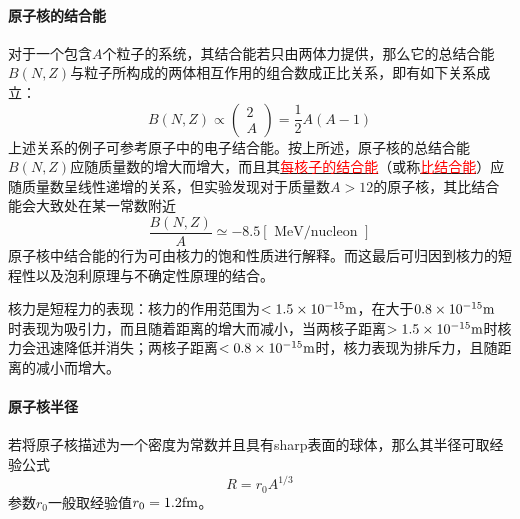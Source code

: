 \paragraph*{原子核的结合能}
对于一个包含$A$个粒子的系统，其结合能若只由两体力提供，那么它的总结合能$B(N,Z)$与粒子所构成的两体相互作用的组合数成正比关系，即有如下关系成立：
\begin{equation*}
	B(N, Z) \propto
	\begin{pmatrix}
		2	\\
		A
	\end{pmatrix}
	= \frac{1}{2} A(A-1)
\end{equation*} 
上述关系的例子可参考原子中的电子结合能。按上所述，原子核的总结合能$B(N,Z)$应随质量数的增大而增大，而且其\underline{\textcolor{red}{每核子的结合能}}（或称\underline{\textcolor{red}{比结合能}}）应随质量数呈线性递增的关系，但实验发现对于质量数$A > 12$的原子核，其比结合能会大致处在某一常数附近
\begin{equation}
	\frac{B(N, Z)}{A} \simeq -8.5 [\text{ MeV/nucleon }]  \label{eq_specific_binding_energy}
\end{equation} 
原子核中结合能的行为可由核力的饱和性质进行解释。而这最后可归因到核力的短程性以及泡利原理与不确定性原理的结合。
\begin{note}
	核力是短程力的表现：核力的作用范围为$< 1.5 \times 10^{-15} {\rm m}$，在大于$0.8 \times 10^{-15} {\rm m}$ 时表现为吸引力，而且随着距离的增大而减小，当两核子距离$> 1.5 \times 10^{-15} {\rm m}$时核力会迅速降低并消失；两核子距离$ < 0.8 \times 10^{-15} {\rm m}$时，核力表现为排斥力，且随距离的减小而增大。
\end{note}

\paragraph*{原子核半径}
若将原子核描述为一个密度为常数并且具有sharp表面的球体，那么其半径可取经验公式
\begin{equation}
	R = r_0 A^{1/3}	\label{eq_nuclear_radius}
\end{equation} 
参数$r_0$一般取经验值$r_0 = 1.2 {\rm fm}$。

